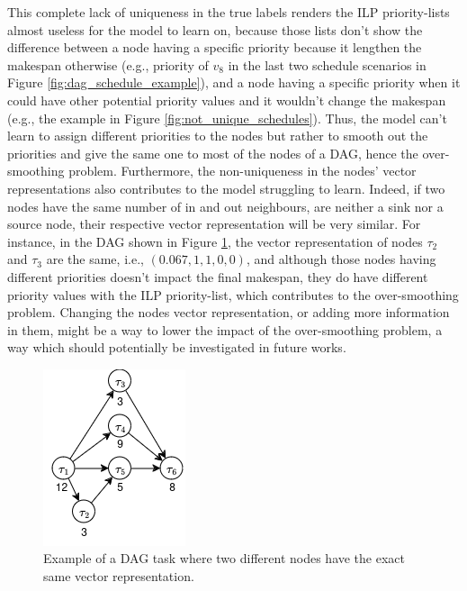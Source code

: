 This complete lack of uniqueness in the true labels 
renders the ILP priority-lists almost useless
for the model to learn on, because those lists
don't show the difference between a node having 
a specific priority because it lengthen the makespan otherwise (e.g.,
priority of $v_8$ in the last two schedule scenarios in Figure \ref{fig:dag_schedule_example}),
and a node having a specific priority when it could have 
other potential priority values and it wouldn't change the makespan (e.g.,
the example in Figure \ref{fig:not_unique_schedules}).
Thus, the model can't learn to assign different priorities
to the nodes but rather to smooth out the priorities and give
the same one to most of the nodes of a DAG,
hence the over-smoothing problem.
Furthermore, the non-uniqueness in the nodes' vector representations
also contributes to the model struggling to learn.
Indeed, 
if two nodes have the same number of in and out neighbours,
are neither a sink nor a source node, their respective
vector representation will be very similar.
For instance, in the DAG shown in Figure \ref{fig:dag_same_representation_vector},
the vector representation of nodes $\tau_2$ and $\tau_3$ are the same,
i.e., $(0.067, 1, 1, 0, 0)$, and although those nodes having different priorities
doesn't impact the final makespan, they do have different priority values
with the ILP priority-list, which contributes to the over-smoothing problem.
Changing the nodes vector representation, or adding  more information in them,
might be a way to lower the impact of the over-smoothing problem,
a way which should potentially be investigated in future works.
\begin{figure}
    \centering
    \includegraphics[width=0.5\linewidth]{images/dag_similarity_representation.png}
    \caption{Example of a DAG task where two different nodes have the
    exact same vector representation.}
    \label{fig:dag_same_representation_vector}
\end{figure}
\\\\

